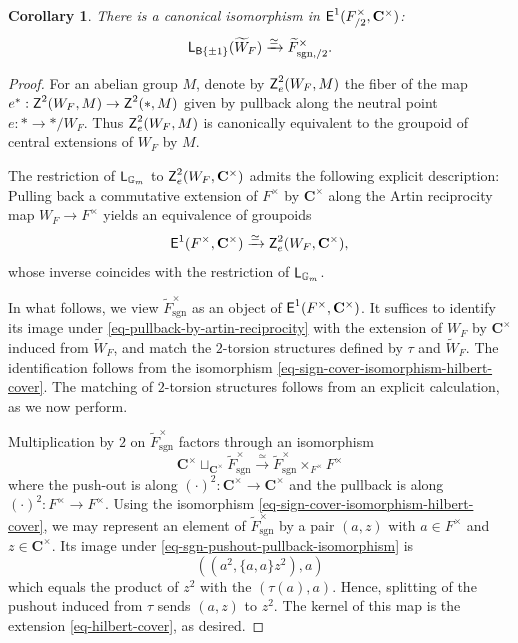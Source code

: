 \documentclass[10pt,english,reqno]{amsart}
\newcommand{\complexes}{\mathbf C}
\newcommand{\cycle}{\textnormal{\textsf{Z}}}
\newcommand{\extension}{\textnormal{\textsf{E}}}
\newcommand{\deloop}{\textnormal{\textsf{B}}}
\newcommand{\sgn}{\mathrm{sgn}}
\newcommand{\Langlands}{\textnormal{\textsf{L}}}
\newtheorem{cor}[subsubsection]{Corollary}
\theoremstyle{definition}
\numberwithin{equation}{section}
\begin{document}
\begin{cor}
\label{cor-sign-cover-dual-identification}
There is a canonical isomorphism in $\extension^1(F^{\times}_{/2}, \complexes^{\times})$:
\begin{equation}
\label{eq-sign-cover-dual-identification}
\Langlands_{\deloop\{\pm 1\}}(\widetilde W_F) \xrightarrow{\simeq} \widetilde F^{\times}_{\sgn, /2}.
\end{equation}
\end{cor}
\begin{proof}
For an abelian group $M$, denote by $\cycle^2_e(W_F, M)$ the fiber of the map $e^* : \cycle^2(W_F, M) \rightarrow \cycle^2(*, M)$ given by pullback along the neutral point $e : * \rightarrow */W_F$. Thus $\cycle^2_e(W_F, M)$ is canonically equivalent to the groupoid of central extensions of $W_F$ by $M$.

The restriction of $\Langlands_{\mathbb G_m}$ to $\cycle^2_e(W_F, \complexes^{\times})$ admits the following explicit description: Pulling back a commutative extension of $F^{\times}$ by $\complexes^{\times}$ along the Artin reciprocity map $W_F \rightarrow F^{\times}$ yields an equivalence of groupoids
\begin{equation}
\label{eq-pullback-by-artin-reciprocity}
\extension^1(F^{\times}, \complexes^{\times}) \xrightarrow{\simeq} \cycle^2_e(W_F, \complexes^{\times}),
\end{equation}
whose inverse coincides with the restriction of $\Langlands_{\mathbb G_m}$.

In what follows, we view $\widetilde F^{\times}_{\sgn}$ as an object of $\extension^1(F^{\times}, \complexes^{\times})$. It suffices to identify its image under \eqref{eq-pullback-by-artin-reciprocity} with the extension of $W_F$ by $\complexes^{\times}$ induced from $\widetilde W_F$, and match the $2$-torsion structures defined by $\tau$ and $\widetilde W_F$. The identification follows from the isomorphism \eqref{eq-sign-cover-isomorphism-hilbert-cover}. The matching of $2$-torsion structures follows from an explicit calculation, as we now perform.

Multiplication by $2$ on $\widetilde F^{\times}_{\sgn}$ factors through an isomorphism
\begin{equation}
\label{eq-sgn-pushout-pullback-isomorphism}
\complexes^{\times} \sqcup_{\complexes^{\times}} \widetilde F^{\times}_{\sgn} \xrightarrow{\simeq} \widetilde F^{\times}_{\sgn} \times_{F^{\times}} F^{\times}
\end{equation}
where the push-out is along $(\cdot)^2 : \complexes^{\times} \rightarrow \complexes^{\times}$ and the pullback is along $(\cdot)^2 : F^{\times} \rightarrow F^{\times}$. Using the isomorphism \eqref{eq-sign-cover-isomorphism-hilbert-cover}, we may represent an element of $\widetilde F^{\times}_{\sgn}$ by a pair $(a, z)$ with $a \in F^{\times}$ and $z\in\complexes^{\times}$. Its image under \eqref{eq-sgn-pushout-pullback-isomorphism} is
$$
((a^2, \{a, a\} z^2), a)
$$
which equals the product of $z^2$ with the $(\tau(a), a)$. Hence, splitting of the pushout induced from $\tau$ sends $(a, z)$ to $z^2$. The kernel of this map is the extension \eqref{eq-hilbert-cover}, as desired.
\end{proof}
\end{document}
